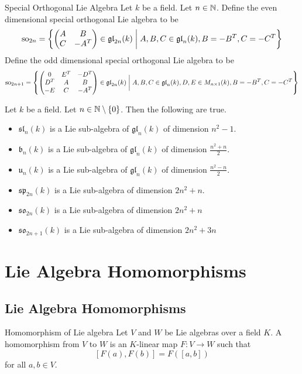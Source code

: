 \documentclass[a4paper]{article}
\begin{document}
\begin{defn}{Special Orthogonal Lie Algebra}{} Let $k$ be a field. Let $n\in\mathbb{N}$. Define the even dimensional special orthogonal Lie algebra to be $$\text{so}_{2n}=\left\{
\begin{pmatrix}
A & B\\
C & -A^T
\end{pmatrix}\in\mathfrak{gl}_{2n}(k)\;\bigg{|}\;A,B,C\in\mathfrak{gl}_n(k), B=-B^T, C=-C^T\right\}$$ Define the odd dimensional special orthogonal Lie algebra to be $$\text{so}_{2n+1}=\left\{
\begin{pmatrix}
0 & E^T & -D^T\\
D^T & A & B\\
-E & C & -A^T
\end{pmatrix}\in\mathfrak{gl}_{2n}(k)\;\bigg{|}\;A,B,C\in\mathfrak{gl}_n(k), D,E\in M_{n\times 1}(k), B=-B^T, C=-C^T\right\}$$
\end{defn}

\begin{prp}{}{} Let $k$ be a field. Let $n\in\mathbb{N}\setminus\{0\}$. Then the following are true. 
\begin{itemize}
\item $\mathfrak{sl}_n(k)$ is a Lie sub-algebra of $\mathfrak{gl}_n(k)$ of dimension $n^2-1$. 
\item $\mathfrak{b}_n(k)$ is a Lie sub-algebra of $\mathfrak{gl}_n(k)$ of dimension $\frac{n^2+n}{2}$. 
\item $\mathfrak{u}_n(k)$ is a Lie sub-algebra of $\mathfrak{gl}_n(k)$ of dimension $\frac{n^2-n}{2}$. 
\item $\mathfrak{sp}_{2n}(k)$ is a Lie sub-algebra of dimension $2n^2+n$. 
\item $\mathfrak{so}_{2n}(k)$ is a Lie sub-algebra of dimension $2n^2+n$
\item $\mathfrak{so}_{2n+1}(k)$ is a Lie sub-algebra of dimension $2n^2+3n$
\end{itemize}
\end{prp}

\pagebreak
\section{Lie Algebra Homomorphisms}
\subsection{Lie Algebra Homomorphisms}
\begin{defn}{Homomorphism of Lie algebra}{} Let $V$ and $W$ be Lie algebras over a field $K$. A homomorphism from $V$ to $W$ is an $K$-linear map $F:V\to W$ such that $$[F(a),F(b)]=F\left([a,b]\right)$$ for all $a,b\in V$. 
\end{defn}
\end{document}
